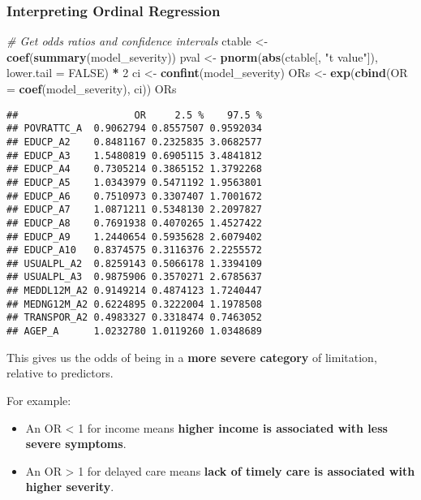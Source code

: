 \documentclass[
]{article}
\newenvironment{Shaded}{\begin{snugshade}}{\end{snugshade}}
\newcommand{\AttributeTok}[1]{\textcolor[rgb]{0.13,0.29,0.53}{#1}}
\newcommand{\CommentTok}[1]{\textcolor[rgb]{0.56,0.35,0.01}{\textit{#1}}}
\newcommand{\ConstantTok}[1]{\textcolor[rgb]{0.56,0.35,0.01}{#1}}
\newcommand{\DecValTok}[1]{\textcolor[rgb]{0.00,0.00,0.81}{#1}}
\newcommand{\FunctionTok}[1]{\textcolor[rgb]{0.13,0.29,0.53}{\textbf{#1}}}
\newcommand{\NormalTok}[1]{#1}
\newcommand{\OtherTok}[1]{\textcolor[rgb]{0.56,0.35,0.01}{#1}}
\newcommand{\SpecialCharTok}[1]{\textcolor[rgb]{0.81,0.36,0.00}{\textbf{#1}}}
\newcommand{\StringTok}[1]{\textcolor[rgb]{0.31,0.60,0.02}{#1}}
\providecommand{\tightlist}{%
  \setlength{\itemsep}{0pt}\setlength{\parskip}{0pt}}
\begin{document}
\subsubsection{Interpreting Ordinal
Regression}\label{interpreting-ordinal-regression}

\begin{Shaded}
\begin{Highlighting}[]
\CommentTok{\# Get odds ratios and confidence intervals}
\NormalTok{ctable }\OtherTok{\textless{}{-}} \FunctionTok{coef}\NormalTok{(}\FunctionTok{summary}\NormalTok{(model\_severity))}
\NormalTok{pval }\OtherTok{\textless{}{-}} \FunctionTok{pnorm}\NormalTok{(}\FunctionTok{abs}\NormalTok{(ctable[, }\StringTok{"t value"}\NormalTok{]), }\AttributeTok{lower.tail =} \ConstantTok{FALSE}\NormalTok{) }\SpecialCharTok{*} \DecValTok{2}
\NormalTok{ci }\OtherTok{\textless{}{-}} \FunctionTok{confint}\NormalTok{(model\_severity)}
\NormalTok{ORs }\OtherTok{\textless{}{-}} \FunctionTok{exp}\NormalTok{(}\FunctionTok{cbind}\NormalTok{(}\AttributeTok{OR =} \FunctionTok{coef}\NormalTok{(model\_severity), ci))}
\NormalTok{ORs}
\end{Highlighting}
\end{Shaded}

\begin{verbatim}
##                    OR     2.5 %    97.5 %
## POVRATTC_A  0.9062794 0.8557507 0.9592034
## EDUCP_A2    0.8481167 0.2325835 3.0682577
## EDUCP_A3    1.5480819 0.6905115 3.4841812
## EDUCP_A4    0.7305214 0.3865152 1.3792268
## EDUCP_A5    1.0343979 0.5471192 1.9563801
## EDUCP_A6    0.7510973 0.3307407 1.7001672
## EDUCP_A7    1.0871211 0.5348130 2.2097827
## EDUCP_A8    0.7691938 0.4070265 1.4527422
## EDUCP_A9    1.2440654 0.5935628 2.6079402
## EDUCP_A10   0.8374575 0.3116376 2.2255572
## USUALPL_A2  0.8259143 0.5066178 1.3394109
## USUALPL_A3  0.9875906 0.3570271 2.6785637
## MEDDL12M_A2 0.9149214 0.4874123 1.7240447
## MEDNG12M_A2 0.6224895 0.3222004 1.1978508
## TRANSPOR_A2 0.4983327 0.3318474 0.7463052
## AGEP_A      1.0232780 1.0119260 1.0348689
\end{verbatim}

This gives us the odds of being in a \textbf{more severe category} of
limitation, relative to predictors.

For example:

\begin{itemize}
\tightlist
\item
  An OR \textless{} 1 for income means \textbf{higher income is
  associated with less severe symptoms}.
\item
  An OR \textgreater{} 1 for delayed care means \textbf{lack of timely
  care is associated with higher severity}.
\end{itemize}
\end{document}
